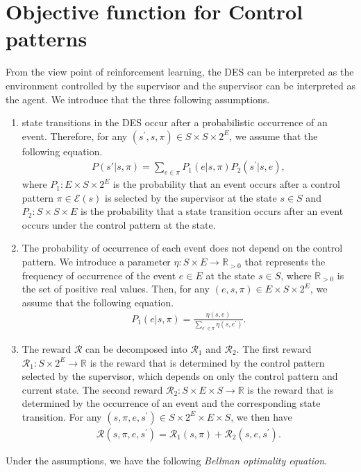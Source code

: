 \documentclass[letterpaper, 10 pt, conference]{ieeeconf}
\begin{document}
\section{Objective function for Control patterns}
From the view point of reinforcement learning, the DES can be interpreted as the environment controlled by the supervisor and the supervisor can be interpreted as the agent. We introduce that the three following assumptions.

\begin{enumerate}
  \item state transitions in the DES occur after a probabilistic occurrence of an event. Therefore, for any $(s^{\prime}, s, \pi) \in S \times S \times 2^E$, we assume that the following equation.
  \begin{align}
    P(s'|s,\pi) = \sum_{e \in \pi}P_1(e|s,\pi) P_2(s^{\prime}|s,e),
  \end{align}
  where $P_1 : E \times S \times 2^E$ is the probability that an event occurs after a control pattern $\pi \in \mathcal{E}(s)$ is selected by the supervisor at the state $s \in S$ and $P_2 : S \times S \times E$ is the probability that a state transition occurs after an event occurs under the control pattern at the state.

  \item The probability of occurrence of each event does not depend on the control pattern. We introduce a parameter $\eta : S \times E \rightarrow \mathbb{R}_{>0}$ that represents the frequency of occurrence of the event $e \in E$ at the state $s \in S$, where $\mathbb{R}_{>0}$ is the set of positive real values. Then, for any $(e,s,\pi) \in E \times S \times 2^E$, we assume that the following equation.
  \begin{align}
    P_1(e|s,\pi) = \frac{\eta(s,e)}{\sum_{e^{\prime} \in \pi} \eta(s,e^{\prime})}.
  \end{align}

  \item The reward $\mathcal{R}$ can be decomposed into $\mathcal{R}_1$ and $\mathcal{R}_2$. The first reward $\mathcal{R}_1 : S \times 2^E \rightarrow \mathbb{R}$ is the reward that is determined by the control pattern selected by the supervisor, which depends on only the control pattern and current state. The second reward $\mathcal{R}_2 : S \times E \times S \rightarrow \mathbb{R}$ is the reward that is determined by the occurrence of an event and the corresponding state transition. For any $(s,\pi,e,s^{\prime}) \in S \times 2^E \times E \times S$, we then have
  \begin{align}
    \mathcal{R}(s,\pi,e,s^{\prime}) = \mathcal{R}_1(s,\pi) + \mathcal{R}_2(s,e,s^{\prime}).
  \end{align}
\end{enumerate}
Under the assumptions, we have the following {\it Bellman optimality equation}.
\end{document}
